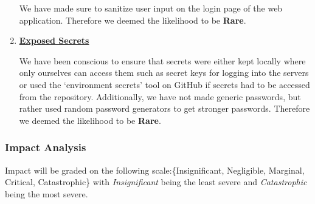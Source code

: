 \begin{enumerate}
    We have made sure to sanitize user input on the login page of the web application. Therefore we deemed the likelihood to be \textbf{Rare}.
    \item \textbf{\underline{Exposed Secrets}}

    We have been conscious to ensure that secrets were either kept locally where only ourselves can access them such as secret keys for logging into the servers or used the ‘environment secrets’ tool on GitHub if secrets had to be accessed from the repository. Additionally, we have not made generic passwords, but rather used random password generators to get stronger passwords. Therefore we deemed the likelihood to be \textbf{Rare}.
\end{enumerate}
\subsubsection{Impact Analysis}
Impact will be graded on the following scale:\{Insignificant, Negligible, Marginal, Critical, Catastrophic\} with \textit{Insignificant} being the least severe and \textit{Catastrophic} being the most severe.
